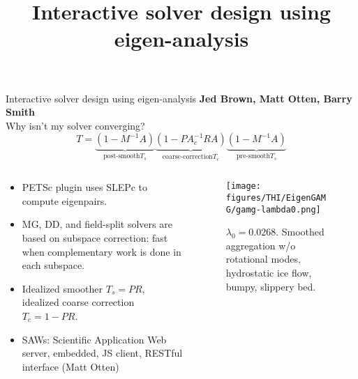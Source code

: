 \documentclass{beamer}
\begin{document}
\title{\bf Interactive solver design using eigen-analysis}

\begin{frame}[shrink=5]{Interactive solver design using eigen-analysis}
  \textbf{\small Jed Brown, Matt Otten, Barry Smith} \\
  Why isn't my solver converging?
  \begin{equation*}
    T = \underbrace{(1 - M^{-1}A)}_{\text{post-smooth} T_s} \underbrace{(1 - P A_c^{-1}R A)}_{\text{coarse-correction} T_c} \underbrace{(1 - M^{-1}A)}_{\text{pre-smooth} T_s}
  \end{equation*}
  \vspace{-1.5em}
  \begin{columns}
    \begin{column}{0.6\textwidth}
      \begin{itemize}
      \item PETSc plugin uses SLEPc to compute eigenpairs.
      \item MG, DD, and field-split solvers are based on subspace correction: fast when complementary work is done in each subspace.
      \item Idealized smoother $T_s = PR$, idealized coarse correction $T_c = 1 - PR$.
      \item SAWs: Scientific Application Web server, embedded, JS client, RESTful interface (Matt Otten)
      \end{itemize}
    \end{column}
    \begin{column}{0.4\textwidth}
      \begin{figure}
        \centering
        \texttt{[image: figures/THI/EigenGAMG/gamg-lambda0.png]}
        \caption{$\lambda_0 = 0.0268$. \small Smoothed aggregation w/o rotational modes, hydrostatic ice flow, bumpy, slippery bed.}
      \end{figure}
    \end{column}
  \end{columns}
\end{frame}
\end{document}
